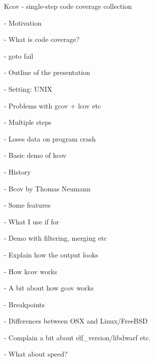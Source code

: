Kcov - single-step code coverage collection

- Motivation

  - What is code coverage?

  - goto fail

- Outline of the presentation


- Setting: UNIX


- Problems with gcov + lcov etc

  - Multiple steps

  - Loses data on program crash


- Basic demo of kcov

- History

  - Bcov by Thomas Neumann

- Some features

  - What I use if for

  - Demo with filtering, merging etc

  - Explain how the output looks


- How kcov works

  - A bit about how gcov works

  - Breakpoints

  - Differences between OSX and Linux/FreeBSD

  - Complain a bit about elf_version/libdwarf etc.


- What about speed?

